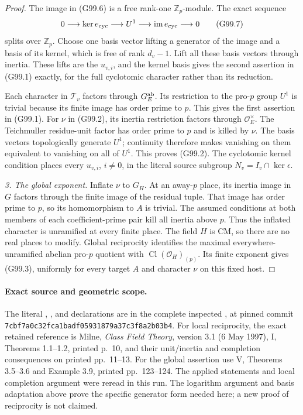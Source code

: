 \begin{proof}
The image in (G99.6) is a free rank-one \(\mathbb Z_p\)-module.
The exact sequence
\[
 0\longrightarrow\ker e_{\rm cyc}\longrightarrow U^1
   \longrightarrow\operatorname{im}e_{\rm cyc}\longrightarrow0
                                                               \tag{G99.7}
\]
splits over \(\mathbb Z_p\).  Choose one basis vector lifting
a generator of the image and a basis of its kernel, which is free
of rank \(d_v-1\).  Lift all these basis vectors through inertia.
These lifts are the \(u_{v,i}\), and the kernel basis gives the
second assertion in (G99.1) exactly, for the full cyclotomic
character rather than its reduction.

Each character in \(\mathcal T_v\) factors through
\(G_E^{\rm ab}\).  Its restriction to the pro-\(p\) group \(U^1\)
is trivial because its finite image has order prime to \(p\).
This gives the first assertion in (G99.1).  For \(\nu\) in
(G99.2), its inertia restriction factors through
\(\mathcal O_E^\times\).  The Teichmuller residue-unit factor
has order prime to \(p\) and is killed by \(\nu\).
The basis vectors topologically generate \(U^1\); continuity
therefore makes vanishing on them equivalent to vanishing on
all of \(U^1\).  This proves (G99.2).  The cyclotomic kernel
condition places every \(u_{v,i}\), \(i\ne0\), in the literal
source subgroup \(N_v=I_v\cap\ker\epsilon\).

\emph{3. The global exponent.}
Inflate \(\nu\) to \(G_H\).  At an away-\(p\) place, its inertia
image in \(G\) factors through the finite image of the residual
tuple.  That image has order prime to \(p\), so its homomorphism
to \(A\) is trivial.  The assumed conditions at both members of
each coefficient-prime pair kill all inertia above \(p\).
Thus the inflated character is unramified at every finite place.
The field \(H\) is CM, so there are no real places to modify.
Global reciprocity identifies the maximal everywhere-unramified
abelian pro-\(p\) quotient with
\(\operatorname{Cl}(\mathcal O_H)_{(p)}\).
Its finite exponent gives (G99.3), uniformly for every target \(A\)
and character \(\nu\) on this fixed host.
\end{proof}

\paragraph{Exact source and geometric scope.}
The literal , , and  declarations are
in the complete inspected
,
at pinned commit
\texttt{7cbf7a0c32fca1badf05931879a37c3f8a2b03b4}.
For local reciprocity, the exact retained reference is Milne,
\emph{Class Field Theory}, version 3.1 (6 May 1997), I,
Theorems 1.1--1.2, printed p.\ 10, and their unit/inertia
and completion consequences on printed pp.\ 11--13.
For the global assertion use V, Theorems 3.5--3.6 and
Example 3.9, printed pp.\ 123--124.  The applied statements
and local completion argument were reread in this run.
The logarithm argument and basis adaptation above prove the
specific generator form needed here; a new proof of reciprocity
is not claimed.

